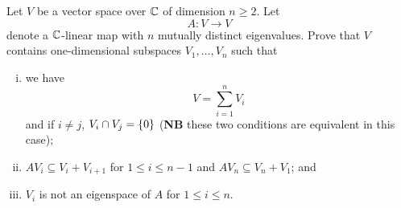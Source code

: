 \begin{question}[subtitle = {August 2022 Problem 5, edited},ID=Aug22_5]
Let $V$ be a vector space over $\mathbb{C}$ of dimension $n \geq 2$. Let
\[A \colon V \to V\]
denote a $\mathbb{C}$-linear map with $n$ mutually distinct eigenvalues. Prove that $V$ contains one-dimensional subspaces $V_1,\dots, V_n$ such that
\begin{enumerate}[(i)]
    \item we have
    \[V = \sum_{i=1}^n V_i\]
    and if $i \neq j$, $V_i \cap V_j = \{0\}$ (\textbf{NB} these two conditions are equivalent in this case);
    \item $AV_i \subseteq V_i + V_{i+1}$ for $1 \leq i \leq n-1$ and $AV_n \subseteq V_n + V_1$; and
    \item $V_i$ is not an eigenspace of $A$ for $1 \leq i \leq n$.
\end{enumerate}
\end{question}
